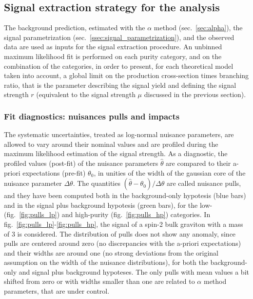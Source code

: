 
\subsection{Signal extraction strategy for the analysis}

The background prediction, estimated with the $\alpha$ method (sec.~\ref{sec:alpha}), the signal parametrization (sec.~\ref{ssec:signal_parametrization}), and the observed data are used as inputs for the signal extraction procedure. An unbinned maximum likelihood fit is performed on each purity category, and on the combination of the categories, in order to present, for each theoretical model taken into account, a global limit on the production cross-section times branching ratio, that is the parameter describing the signal yield and defining the signal strength $r$ (equivalent to the signal strength $\mu$ discussed in the previous section).

\subsubsection{Fit diagnostics: nuisances pulls and impacts}

The systematic uncertainties, treated as log-normal nuisance parameters, are allowed to vary around their nominal values and are profiled during the maximum likelihood estimation of the signal strength. As a diagnostic, the profiled values (post-fit) of the nuisance parameters $\hat{\theta}$ are compared to their a-priori expectations (pre-fit) $\theta_0$, in unities of the width of the gaussian core of the nuisance parameter $\Delta \theta$. The quantities $(\hat{\theta} - \theta_0) / \Delta \theta$ are called nuisance pulls, and they have been computed both in the background-only hypotesis (blue bars) and in the signal plus background hypotesis (green bars), for the low- (fig.~\ref{fig:pulls_lp}) and high-purity (fig.~\ref{fig:pulls_hp}) categories. In fig.~\ref{fig:pulls_lp}-\ref{fig:pulls_hp}, the signal of a spin-2 bulk graviton with a mass of 3 \TeV is considered. The distribution of pulls does not show any anomaly, since pulls are centered around zero (no discrepancies with the a-priori expectations) and their widths are around one (no strong deviations from the original assumption on the width of the nuisance distributions), for both the background-only and signal plus background hypoteses. The only pulls with mean values a bit shifted from zero or with widths smaller than one are related to $\alpha$ method parameters, that are under control.

